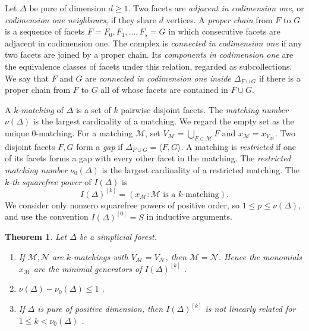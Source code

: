 \documentclass{amsart}
\newtheorem{Theorem}{Theorem}[section]
\theoremstyle{definition}
\theoremstyle{remark}
\begin{document}
Let $\Delta$ be pure of dimension $d\geq1$.
Two facets are {\em adjacent in codimension one}, or
{\em codimension one neighbours}, if they share $d$ vertices.
A {\em proper chain} from $F$ to $G$ is a sequence of facets
$F=F_0,F_1,\ldots,F_s=G$ in which consecutive facets are adjacent in
codimension one.
The complex is {\em connected in codimension one} if any two facets are
joined by a proper chain. Its {\em components in codimension one} are
the equivalence classes of facets under this relation, regarded as
subcollections.
We say that $F$ and $G$ are {\em connected in codimension one inside
$\Delta_{F\cup G}$} if there is a proper chain from $F$ to $G$ all of
whose facets are contained in $F\cup G$.

A {\em $k$-matching} of $\Delta$ is a set of $k$ pairwise disjoint facets.
The {\em matching number} $\nu(\Delta)$ is the largest cardinality of
a matching. We regard the empty set as the unique $0$-matching.
For a matching $\mathcal M$, set
$V_{\mathcal M}=\bigcup_{F\in\mathcal M}F$ and
$x_{\mathcal M}=x_{V_{\mathcal M}}$.
Two disjoint facets $F,G$ form a {\em gap} if
$\Delta_{F\cup G}=\langle F,G\rangle$.
A matching is {\em restricted} if one of its facets forms a gap with
every other facet in the matching. The {\em restricted matching number}
$\nu_0(\Delta)$ is the largest cardinality of a restricted matching.
The {\em $k$-th squarefree power} of $I(\Delta)$ is
\[
I(\Delta)^{[k]}=(x_{\mathcal M}:\mathcal M\text{ is a }k\text{-matching}).
\]
We consider only nonzero squarefree powers of positive order, so
$1\leq p\leq\nu(\Delta)$, and use the convention $I(\Delta)^{[0]}=S$
in inductive arguments.



\begin{Theorem}\label{thm:KNQ}
Let $\Delta$ be a simplicial forest.
\begin{enumerate}
\item[\textnormal{(a)}] If $\mathcal M,\mathcal N$ are $k$-matchings with $V_{\mathcal M}=V_{\mathcal N}$, then $\mathcal M=\mathcal N$. Hence the monomials $x_{\mathcal M}$ are the minimal generators of $I(\Delta)^{[k]}$ \textnormal{\cite[Proposition~1.2, Corollary~1.3]{KNQ24squarefree}}.
\item[\textnormal{(b)}] $\nu(\Delta)-\nu_0(\Delta)\leq 1$ \textnormal{\cite[Proposition~1.4]{KNQ24squarefree}}.
\item[\textnormal{(c)}] If $\Delta$ is pure of positive dimension, then $I(\Delta)^{[k]}$ is not linearly related for $1\leq k<\nu_0(\Delta)$ \textnormal{\cite[Theorem~3.3]{KNQ24squarefree}}.
\end{enumerate}
\end{Theorem}
\end{document}
